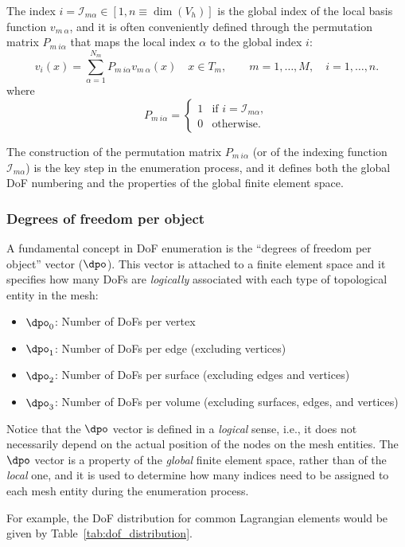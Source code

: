 The index $i = \mathcal{I}_{m\alpha} \in [1,n \equiv\dim(V_h) ]$ is the global index of the local basis function $v_{m~\alpha}$, and it is often conveniently defined through the permutation matrix $P_{m~i\alpha}$ that maps the local index $\alpha$ to the global index $i$:
\[
  v_{i}(x) = \sum_{\alpha=1}^{N_m} P_{m~i\alpha} v_{m~\alpha}(x) \quad x \in T_m, \qquad m = 1,\ldots,M, \quad i = 1,\ldots,n.
\]
where 
\[
  P_{m~i\alpha} = \begin{cases}
    1 & \text{if } i = \mathcal{I}_{m\alpha}, \\
    0 & \text{otherwise}.
  \end{cases}
\]

The construction of the permutation matrix $P_{m~i\alpha}$ (or of the indexing function $\mathcal{I}_{m\alpha}$) is the key step in the enumeration process, and it defines both the global DoF numbering and the properties of the global finite element space.

\subsubsection{Degrees of freedom per object}

A fundamental concept in DoF enumeration is the ``degrees of freedom per object'' vector ($\dpo$). This vector is attached to a finite element space and it specifies how many DoFs are \emph{logically} associated with each type of topological entity in the mesh:

\begin{itemize}
  \item $\dpo_0$: Number of DoFs per vertex
  \item $\dpo_1$: Number of DoFs per edge (excluding vertices)
  \item $\dpo_2$: Number of DoFs per surface (excluding edges and vertices)
  \item $\dpo_3$: Number of DoFs per volume (excluding surfaces, edges, and vertices)
\end{itemize}

Notice that the $\dpo$ vector is defined in a \emph{logical} sense, i.e., it does not necessarily depend on the actual position of the nodes on the mesh entities. The $\dpo$ vector is a property of the \emph{global} finite element space, rather than of the \emph{local} one,  and it is used to determine how many indices need to be assigned to each mesh entity during the enumeration process.

For example, the DoF distribution for common Lagrangian elements would be given by Table~\ref{tab:dof_distribution}.

